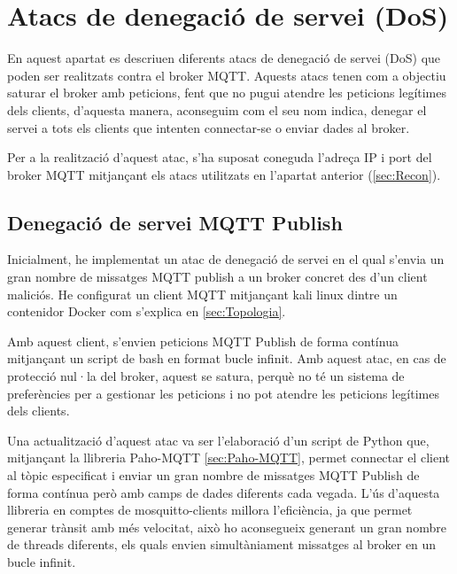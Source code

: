 \section{Atacs de denegació de servei (DoS)}

En aquest apartat es descriuen diferents atacs de denegació de servei (DoS) que poden ser realitzats contra el broker MQTT. Aquests atacs tenen com a objectiu saturar el broker amb peticions, fent que no pugui atendre les peticions legítimes dels clients, d'aquesta manera, aconseguim com el seu nom indica, denegar el servei a tots els clients que intenten connectar-se o enviar dades al broker.

Per a la realització d'aquest atac, s'ha suposat coneguda l'adreça IP i port del broker MQTT mitjançant els atacs utilitzats en l'apartat anterior (\ref{sec:Recon}).

\subsection{Denegació de servei MQTT Publish}

Inicialment, he implementat un atac de denegació de servei en el qual s'envia un gran nombre de missatges MQTT publish a un broker concret des d'un client maliciós. He configurat un client MQTT mitjançant kali linux dintre un contenidor Docker com s'explica en \ref{sec:Topologia}.

Amb aquest client, s'envien peticions MQTT Publish de forma contínua mitjançant un script de bash en format bucle infinit. Amb aquest atac, en cas de protecció nul·la del broker, aquest se satura, perquè no té un sistema de preferències per a gestionar les peticions i no pot atendre les peticions legítimes dels clients.

Una actualització d'aquest atac va ser l'elaboració d'un script de Python que, mitjançant la llibreria Paho-MQTT \ref{sec:Paho-MQTT}, permet connectar el client al tòpic especificat i enviar un gran nombre de missatges MQTT Publish de forma contínua però amb camps de dades diferents cada vegada. L'ús d'aquesta llibreria en comptes de mosquitto-clients millora l'eficiència, ja que permet generar trànsit amb més velocitat, això ho aconsegueix generant un gran nombre de threads diferents, els quals envien simultàniament missatges al broker en un bucle infinit.

